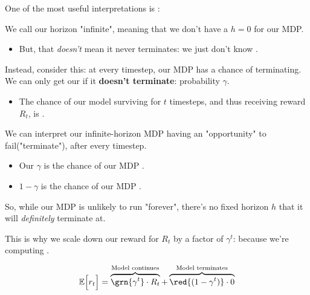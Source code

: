         One of the most useful interpretations is : 

        We call our horizon "infinite", meaning that we don't have a  $h=0$ for our MDP.
        
        \begin{itemize}
            \item But, that \textit{doesn't} mean it never terminates: we just don't know .
        \end{itemize}

        Instead, consider this: at every timestep, our MDP has a  chance of terminating. We can only get our  if it \textbf{doesn't terminate}: probability $\gamma$.

        \begin{itemize}

            \item The chance of our model surviving for $t$ timesteps, and thus receiving reward $R_t$, is .\\
        \end{itemize}

        \begin{concept}
            We can interpret our infinite-horizon MDP having an "opportunity" to fail("terminate"), after every timestep.
            
            \begin{itemize}
                \item Our  $\gamma$ is the chance of our MDP .
                \item $1-\gamma$ is the chance of our MDP .
            \end{itemize}

            So, while our MDP is unlikely to run "forever", there's no fixed horizon $h$ that it will \textit{definitely} terminate at.
        \end{concept}

        This is why we scale down our reward for $R_t$ by a factor of $\gamma^t$: because we're computing .

        \begin{equation}
            \mathbb{E}\Big[ r_t  \Big] = 
            \overbrace{\grn{\gamma^t} \cdot R_t}^{\text{Model continues}} + 
            \overbrace{\red{(1-\gamma^t)} \cdot 0}^{\text{Model terminates}}
        \end{equation}

